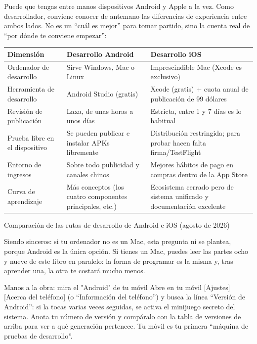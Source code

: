 Puede que tengas entre manos dispositivos Android y Apple a la vez. Como desarrollador, conviene conocer de antemano las diferencias de experiencia entre ambos lados. No es un “cuál es mejor” para tomar partido, sino la cuenta real de “por dónde te conviene empezar”:

\begin{center}
\begin{tabularx}{\linewidth}{|X|X|X|}
\hline
\textbf{Dimensión} & \textbf{Desarrollo Android} & \textbf{Desarrollo iOS} \tabularnewline
\hline
Ordenador de desarrollo & Sirve Windows, Mac o Linux & Imprescindible Mac (Xcode es exclusivo) \tabularnewline
Herramienta de desarrollo & Android Studio (gratis) & Xcode (gratis) + cuota anual de publicación de 99 dólares \tabularnewline
Revisión de publicación & Laxa, de unas horas a unos días & Estricta, entre 1 y 7 días es lo habitual \tabularnewline
Prueba libre en el dispositivo & Se pueden publicar e instalar APKs libremente & Distribución restringida; para probar hacen falta firma/TestFlight \tabularnewline
Entorno de ingresos & Sobre todo publicidad y canales chinos & Mejores hábitos de pago en compras dentro de la App Store \tabularnewline
Curva de aprendizaje & Más conceptos (los cuatro componentes principales, etc.) & Ecosistema cerrado pero de sistema unificado y documentación excelente \tabularnewline
\hline
\end{tabularx}
\end{center}

\begin{center}\small\color{gray}Comparación de las rutas de desarrollo de Android e iOS (agosto de 2026)\end{center}

Siendo sinceros: si tu ordenador no es un Mac, esta pregunta ni se plantea, porque Android es la única opción. Si tienes un Mac, puedes leer las partes ocho y nueve de este libro en paralelo: la forma de programar es la misma y, tras aprender una, la otra te costará mucho menos.

\begin{tcbpractice}{Manos a la obra: mira el "Android" de tu móvil}
Abre en tu móvil [Ajustes] [Acerca del teléfono] (o “Información del teléfono”) y busca la línea “Versión de Android”: si la tocas varias veces seguidas, se activa el minijuego secreto del sistema. Anota tu número de versión y compáralo con la tabla de versiones de arriba para ver a qué generación pertenece. Tu móvil es tu primera “máquina de pruebas de desarrollo”.

\end{tcbpractice}

